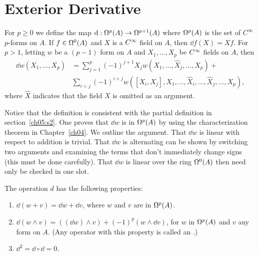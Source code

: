 \documentclass[../main]{subfiles}
\begin{document}
\section{Exterior Derivative}\label{ch07:s1}
For $p \ge 0$ we define the  map $\dd : \formbundle{A}{p} \functionMaps \formbundle{A}{p+1}$ where $\formbundle{A}{p}$ is the set of $C^\infty$ $p$-forms on $A$. If $f \in \formbundle{A}{0}$ and $X$ is a $\CInfty$ field on $A$, then $\dd f(X) = X f$. For $p > 1$, letting $w$ be a $(p - 1)$ form on $A$ and $X_1, \ldots, X_p$ be $\CInfty$ fields on $A$, then
\begin{equation}\tag{1}
\label{eqn:ch07.1}
\begin{split}
\dd w(X_1, \ldots, X_p) & = \sum_{j = 1}^p (-1)^{j + 1} X_j w(X_1, \ldots, \widehat X_j, \ldots, X_p) + \\
& \sum_{i < j} (-1)^{i + j} w([X_i, X_j], X_1, \ldots, \widehat X_i, \ldots, \widehat X_j, \ldots, X_p),
\end{split}
\end{equation}
where $\widehat X$ indicates that the field $X$ is omitted as an argument.

\par Notice that the definition is consistent with the partial definition in section~\ref{ch05:s2}. One proves that $\dd w$ is in $\formbundle{A}{p}$ by using the characterization theorem in Chapter~\ref{ch04}. We outline the argument. That $\dd w$ is linear with respect to addition is trivial. That $\dd w$ is alternating can be shown by switching two arguments and examining the terms that don't immediately change signs (this must be done carefully). That $\dd w$ is linear over the ring $\formbundle{A}{0}$ then need only be checked in one slot.



\begin{proposition} \label{prop:ch7.1.1}
The operation $d$ has the following properties:

\begin{enumerate}[label=(\arabic*)]
	\item $\dd(w + v) = \dd w + \dd v$, where $w$ and $v$ are in $\formbundle{A}{p}$.\label{enu:ch07.1.1}
	\item $\dd(w \wedge v) = ((\dd w) \wedge v) + (-1)^p (w \wedge \dd v)$, for $w$ in $\formbundle{A}{p}$ and $v$ any form on $A$. (Any operator with this property is called an .)\label{enu:ch07.1.2}
	\item $\dd^2 = \dd \circ \dd = 0$.\label{enu:ch07.1.3}
\end{enumerate}
\end{proposition}
\end{document}
